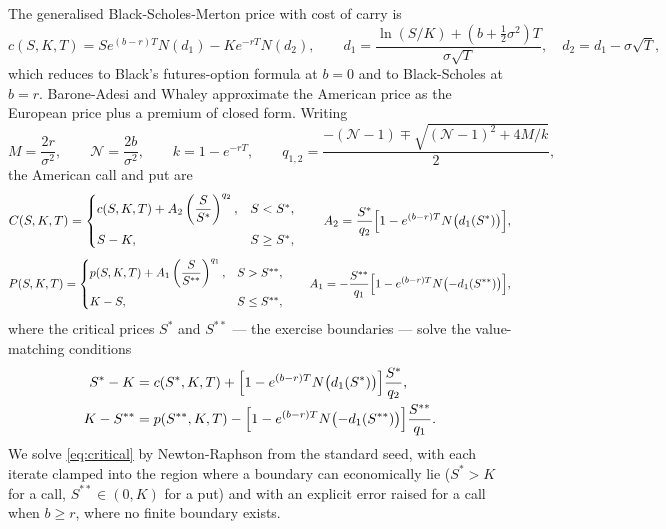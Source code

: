 \documentclass[11pt]{article}
\begin{document}
The generalised Black-Scholes-Merton price with cost of carry \citep{black1973,merton1973}
is
\begin{equation}
  c(S,K,T)=Se^{(b-r)T}N(d_1)-Ke^{-rT}N(d_2),
  \qquad
  d_{1}=\frac{\ln(S/K)+(b+\tfrac{1}{2}\sigma^{2})T}{\sigma\sqrt{T}},
  \quad d_2=d_1-\sigma\sqrt{T},
  \label{eq:gbsm}
\end{equation}
which reduces to Black's futures-option formula at $b=0$ and to Black-Scholes at $b=r$.
Barone-Adesi and Whaley \citeyearpar{baw1987} approximate the American price as the
European price plus a premium of closed form. Writing
\begin{equation}
  M=\frac{2r}{\sigma^{2}},\qquad
  \mathcal{N}=\frac{2b}{\sigma^{2}},\qquad
  k=1-e^{-rT},\qquad
  q_{1,2}=\frac{-(\mathcal{N}-1)\mp\sqrt{(\mathcal{N}-1)^{2}+4M/k}}{2},
  \label{eq:baw-roots}
\end{equation}
the American call and put are
\begin{equation}
  C(S,K,T)=
  \begin{cases}
    c(S,K,T)+A_2\left(\dfrac{S}{S^{*}}\right)^{q_2}, & S<S^{*},\\[10pt]
    S-K, & S\ge S^{*},
  \end{cases}
  \qquad
  A_2=\frac{S^{*}}{q_2}\Bigl[1-e^{(b-r)T}N\bigl(d_1(S^{*})\bigr)\Bigr],
  \label{eq:baw-call}
\end{equation}
\begin{equation}
  P(S,K,T)=
  \begin{cases}
    p(S,K,T)+A_1\left(\dfrac{S}{S^{**}}\right)^{q_1}, & S>S^{**},\\[10pt]
    K-S, & S\le S^{**},
  \end{cases}
  \qquad
  A_1=-\frac{S^{**}}{q_1}\Bigl[1-e^{(b-r)T}N\bigl(-d_1(S^{**})\bigr)\Bigr],
  \label{eq:baw-put}
\end{equation}
where the critical prices $S^{*}$ and $S^{**}$ --- the exercise boundaries --- solve the
value-matching conditions
\begin{align}
  S^{*}-K   &= c(S^{*},K,T)   + \Bigl[1-e^{(b-r)T}N\bigl( d_1(S^{*})  \bigr)\Bigr]\frac{S^{*}}{q_2},
  \nonumber\\
  K-S^{**}  &= p(S^{**},K,T)  - \Bigl[1-e^{(b-r)T}N\bigl(-d_1(S^{**}) \bigr)\Bigr]\frac{S^{**}}{q_1}.
  \label{eq:critical}
\end{align}
We solve \eqref{eq:critical} by Newton-Raphson from the standard seed, with each iterate
clamped into the region where a boundary can economically lie ($S^{*}>K$ for a call,
$S^{**}\in(0,K)$ for a put) and with an explicit error raised for a call when $b\ge r$,
where no finite boundary exists.
\end{document}
